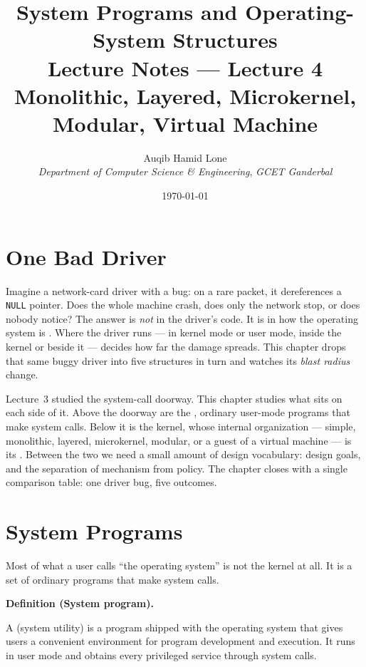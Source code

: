 \documentclass[11pt]{article}
\title{System Programs and Operating-System Structures\\\large Lecture Notes --- Lecture 4\\
  \normalsize Monolithic, Layered, Microkernel, Modular, Virtual Machine}
\author{Auqib Hamid Lone\\[0.3em]
  \emph{Department of Computer Science \& Engineering}, \emph{GCET Ganderbal}}
\date{\today}
\newenvironment{definitionbox}[1]{%
  \par\noindent\textbf{Definition (#1).}\ \itshape
}{\par\vspace{0.3em}}
\begin{document}
\maketitle

\section{One Bad Driver}

Imagine a network-card driver with a bug: on a rare packet, it dereferences a
\texttt{NULL} pointer. Does the whole machine crash, does only the network stop,
or does nobody notice? The answer is \emph{not} in the driver's code. It is in
how the operating system is . Where the driver runs --- in kernel
mode or user mode, inside the kernel or beside it --- decides how far the damage
spreads. This chapter drops that same buggy driver into five structures in turn
and watches its \emph{blast radius} change.

Lecture~3 studied the system-call doorway. This chapter studies what sits on each
side of it. Above the doorway are the , ordinary user-mode
programs that make system calls. Below it is the kernel, whose internal
organization --- simple, monolithic, layered, microkernel, modular, or a guest
of a virtual machine --- is its . Between the two we need a
small amount of design vocabulary: design goals, and the separation of
mechanism from policy. The chapter closes with a single comparison table: one
driver bug, five outcomes.

\noindent{}

\section{System Programs}

\noindent{}

Most of what a user calls ``the operating system'' is not the kernel at all. It
is a set of ordinary programs that make system calls.

\begin{definitionbox}{System program}
A  (system utility) is a program shipped with the operating
system that gives users a convenient environment for program development and
execution. It runs in user mode and obtains every privileged service through
system calls.
\end{definitionbox}
\end{document}
